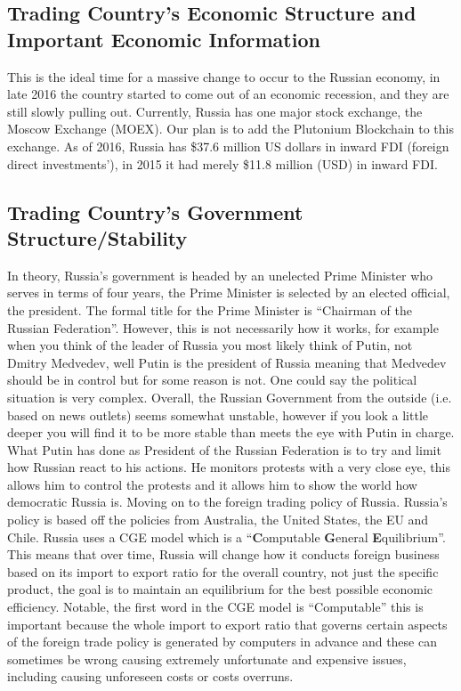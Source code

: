 \documentclass[12pt]{article}
\begin{document}
\subsection{Trading Country's Economic Structure and Important Economic Information}
This is the ideal time for a massive change to occur to the Russian economy, in late 2016
the country started to come out of an economic recession, and they are still slowly pulling
out. Currently, Russia has one major stock exchange, the Moscow Exchange (MOEX). Our plan is to add the Plutonium Blockchain to this exchange. As of 2016, Russia has \$37.6 million US dollars in inward FDI (foreign direct investments’), in 2015 it had merely \$11.8 million (USD) in inward FDI. 
\subsection{Trading Country's Government Structure/Stability}
In theory, Russia's government is headed by an unelected Prime Minister who serves in terms of four years, the Prime Minister is selected by an elected official, the president. The formal title for the Prime Minister is “Chairman of the Russian Federation”. However, this is not necessarily how it works, for example when you think of the leader of Russia you most likely think of Putin, not Dmitry Medvedev, well Putin is the president of Russia meaning that Medvedev should be in control but for some reason is not. One could say the political situation is very complex. Overall, the Russian Government from the outside (i.e. based on news outlets) seems somewhat unstable, however if you look a little deeper you will find it to be more stable than meets the eye with Putin in charge. What Putin has done as President of the Russian Federation is to try and limit how Russian react to his actions. He monitors protests with a very close eye, this allows him to control the protests and it allows him to show the world how democratic Russia is. Moving on to the foreign trading policy of Russia. Russia’s policy is based off the policies from Australia, the United States, the EU and Chile. Russia uses a CGE model which is a ``\textbf{C}omputable \textbf{G}eneral \textbf{E}quilibrium''. This means that over time, Russia will change how it conducts foreign business based on its import to export ratio for the overall country, not just the specific product, the goal is to maintain an equilibrium for the best possible economic efficiency. Notable, the first word in the CGE model is “Computable” this is important because the whole import to export ratio that governs certain aspects of the foreign trade policy is
generated by computers in advance and these can sometimes be wrong causing extremely
unfortunate and expensive issues, including causing unforeseen costs or costs overruns.
\end{document}
